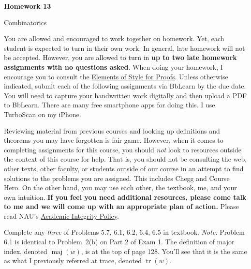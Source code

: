 \documentclass[11pt]{article}%
\theoremstyle{definition}
\DeclareMathOperator{\tr}{tr}
\DeclareMathOperator{\maj}{maj}
\newcommand{\blankline}{\pagebreak[2]\vspace{.5\baselineskip}}
\begin{document}
\begin{center}
{\Large\bf Homework 13}

\smallskip

Combinatorics
\end{center}

\thispagestyle{fancy}

You are allowed and encouraged to work together on homework. Yet, each student is expected to turn in their own work. In general, late homework will not be accepted. However, you are allowed to turn in \textbf{up to two late homework assignments with no questions asked}. When doing your homework, I encourage you to consult the \href{http://danaernst.com/teaching/ElementsOfStyle.pdf}{Elements of Style for Proofs}. Unless otherwise indicated, submit each of the following assignments via BbLearn by the due date. You will need to capture your handwritten work digitally and then upload a PDF to BbLearn. There are many free smartphone apps for doing this. I use TurboScan on my iPhone.

\blankline

Reviewing material from previous courses and looking up definitions and theorems you may have forgotten is fair game. However, when it comes to completing assignments for this course, you should \emph{not} look to resources outside the context of this course for help.  That is, you should not be consulting the web, other texts, other faculty, or students outside of our course in an attempt to find solutions to the problems you are assigned.  This includes Chegg and Course Hero. On the other hand, you may use each other, the textbook, me, and your own intuition. \textbf{If you feel you need additional resources, please come talk to me and we will come up with an appropriate plan of action.} Please read NAU's \href{https://www5.nau.edu/policies/Client/Details/828?whoIsLooking=Students&pertainsTo=All&sortDirection=Ascending&page=1}{Academic Integrity Policy}.

\blankline

Complete any \emph{three} of Problems 5.7, 6.1, 6.2, 6.4, 6.5 in textbook. \emph{Note:} Problem 6.1 is identical to  Problem~2(b) on Part 2 of Exam 1. The definition of major index, denoted $\maj(w)$, is at the top of page 128. You'll see that it is the same as what I previously referred at trace, denoted $\tr(w)$.
\end{document}
